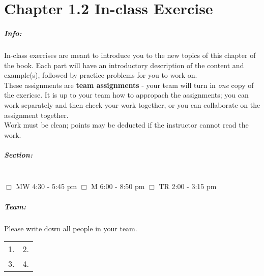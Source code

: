 \documentclass[a4paper,12pt]{book}
\title{}
\author{Rachel Morris}
\date{\today}
\begin{document}
    
    \chapter*{Chapter 1.2 In-class Exercise} 

    \paragraph{Info:}
    In-class exercises are meant to introduce you to the new topics
    of this chapter of the book. Each part will have an introductory
    description of the content and example(s), followed by practice
    problems for you to work on. ~\\

    These assignments are \textbf{team assignments} - your team will
    turn in \textit{one} copy of the exericse. It is up to your team
    how to appropach the assignments; you can work separately and then
    check your work together, or you can collaborate on the assignment
    together. ~\\

    Work must be clean; points may be deducted if the instructor cannot
    read the work.

    \paragraph{Section:} ~\\
        $\Box$ MW 4:30 - 5:45 pm \tab
        $\Box$ M 6:00 - 8:50 pm \tab
        $\Box$ TR 2:00 - 3:15 pm

    \paragraph{Team:}
    Please write down all people in your team. ~\\

    \begin{tabular}{ p{6cm} p{6cm} }
        1. & 2. \\
        3. & 4.
    \end{tabular}

    ~\\
\end{document}
